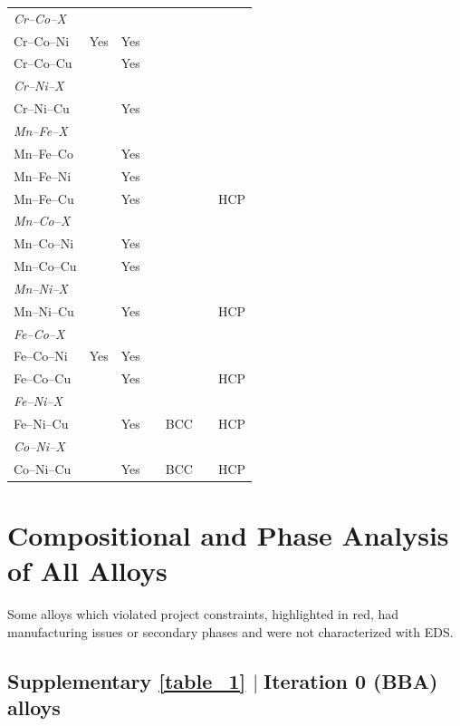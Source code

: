 \documentclass[final,5p,times,twocolumn]{elsarticle}
\begin{document}
\begin{longtable}{lcccccc}
\hline
\multicolumn{7}{l}{\textit{Cr--Co--X}} \\
Cr--Co--Ni  & Yes & Yes &        &     &     &     \\
Cr--Co--Cu  &     & Yes &        &     &     &     \\
\hline
\multicolumn{7}{l}{\textit{Cr--Ni--X}} \\
Cr--Ni--Cu  &     & Yes &        &     &     &     \\
\hline
\multicolumn{7}{l}{\textit{Mn--Fe--X}} \\
Mn--Fe--Co  &     & Yes &        &     &     &     \\
Mn--Fe--Ni  &     & Yes &        &     &     &     \\
Mn--Fe--Cu  &     & Yes &        &     &     & HCP \\
\hline
\multicolumn{7}{l}{\textit{Mn--Co--X}} \\
Mn--Co--Ni  &     & Yes &        &     &     &     \\
Mn--Co--Cu  &     & Yes &        &     &     &     \\
\hline
\multicolumn{7}{l}{\textit{Mn--Ni--X}} \\
Mn--Ni--Cu  &     & Yes &        &     &     & HCP \\
\hline
\multicolumn{7}{l}{\textit{Fe--Co--X}} \\
Fe--Co--Ni  & Yes & Yes &        &     &     &     \\
Fe--Co--Cu  &     & Yes &        &     &     & HCP \\
\hline
\multicolumn{7}{l}{\textit{Fe--Ni--X}} \\
Fe--Ni--Cu  &     & Yes &        & BCC &     & HCP \\
\hline
\multicolumn{7}{l}{\textit{Co--Ni--X}} \\
Co--Ni--Cu  &     & Yes &        & BCC &     & HCP \\
 
\end{longtable}
\normalsize

 

\newpage
\section{Compositional and Phase Analysis of All Alloys}
\label{s1_compositions}
    Some alloys which violated project constraints, highlighted in red, had manufacturing issues or secondary phases and were not characterized with EDS.

    \subsection{\texorpdfstring{\textbf{Supplementary \autoref{table_1}} \texorpdfstring{$\mid\;$}{Lg}Iteration 0 (BBA) alloys}{Supplementary Table 1 | Iteration 0 (BBA) alloys}}
\end{document}
